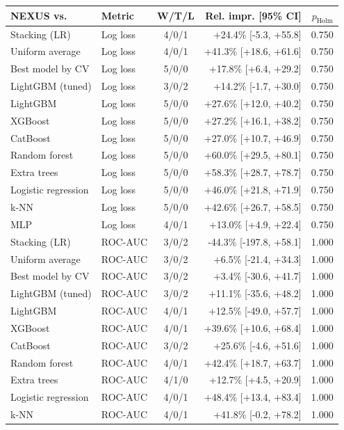 \begin{tabular}{llcrr}
\toprule
NEXUS vs. & Metric & W/T/L & Rel. impr. [95\% CI] & $p_\text{Holm}$\\
\midrule
Stacking (LR) & Log loss & 4/0/1 & +24.4\% [-5.3, +55.8] & 0.750\\
Uniform average & Log loss & 4/0/1 & +41.3\% [+18.6, +61.6] & 0.750\\
Best model by CV & Log loss & 5/0/0 & +17.8\% [+6.4, +29.2] & 0.750\\
LightGBM (tuned) & Log loss & 3/0/2 & +14.2\% [-1.7, +30.0] & 0.750\\
LightGBM & Log loss & 5/0/0 & +27.6\% [+12.0, +40.2] & 0.750\\
XGBoost & Log loss & 5/0/0 & +27.2\% [+16.1, +38.2] & 0.750\\
CatBoost & Log loss & 5/0/0 & +27.0\% [+10.7, +46.9] & 0.750\\
Random forest & Log loss & 5/0/0 & +60.0\% [+29.5, +80.1] & 0.750\\
Extra trees & Log loss & 5/0/0 & +58.3\% [+28.7, +78.7] & 0.750\\
Logistic regression & Log loss & 5/0/0 & +46.0\% [+21.8, +71.9] & 0.750\\
k-NN & Log loss & 5/0/0 & +42.6\% [+26.7, +58.5] & 0.750\\
MLP & Log loss & 4/0/1 & +13.0\% [+4.9, +22.4] & 0.750\\
Stacking (LR) & ROC-AUC & 3/0/2 & -44.3\% [-197.8, +58.1] & 1.000\\
Uniform average & ROC-AUC & 3/0/2 & +6.5\% [-21.4, +34.3] & 1.000\\
Best model by CV & ROC-AUC & 3/0/2 & +3.4\% [-30.6, +41.7] & 1.000\\
LightGBM (tuned) & ROC-AUC & 3/0/2 & +11.1\% [-35.6, +48.2] & 1.000\\
LightGBM & ROC-AUC & 4/0/1 & +12.5\% [-49.0, +57.7] & 1.000\\
XGBoost & ROC-AUC & 4/0/1 & +39.6\% [+10.6, +68.4] & 1.000\\
CatBoost & ROC-AUC & 3/0/2 & +25.6\% [-4.6, +51.6] & 1.000\\
Random forest & ROC-AUC & 4/0/1 & +42.4\% [+18.7, +63.7] & 1.000\\
Extra trees & ROC-AUC & 4/1/0 & +12.7\% [+4.5, +20.9] & 1.000\\
Logistic regression & ROC-AUC & 4/0/1 & +48.4\% [+13.4, +83.4] & 1.000\\
k-NN & ROC-AUC & 4/0/1 & +41.8\% [-0.2, +78.2] & 1.000\\

\end{tabular}
